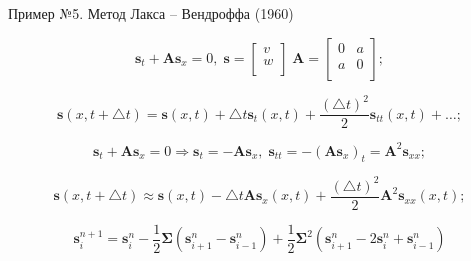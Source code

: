 \documentclass[10pt,xcolor=pst,aspectratio=169]{beamer}
\begin{document}
\begin{frame}{Пример №5. Метод Лакса -- Вендроффа (1960)}

    \transdissolve[duration=0.1]
    \justifying
    \large

    \[
        \mathbf{s}_{t} + \mathbf{A} \mathbf{s}_{x} = 0, \;
        \mathbf{s}
        =
        \begin{bmatrix}
           v \\
           w \\
        \end{bmatrix} \;
        \mathbf{A}
        =
        \begin{bmatrix}
           0 & a \\
           a & 0 \\
        \end{bmatrix};
    \]

    \[
        \mathbf{s} \left( x, t + \triangle t \right)
        =
        \mathbf{s} \left( x, t \right)
        + \triangle t \mathbf{s}_{t} \left( x, t \right)
        + \frac{\left( \triangle t \right)^{2}}{2} \mathbf{s}_{t t} \left( x, t \right)
        + \ldots;
    \]

    \[
        \mathbf{s}_{t} + \mathbf{A} \mathbf{s}_{x} = 0
        \Rightarrow
        \mathbf{s}_{t} = -\mathbf{A} \mathbf{s}_{x}, \;
        \mathbf{s}_{t t} = -\left( \mathbf{A} \mathbf{s}_{x} \right)_{t} = \mathbf{A}^{2} \mathbf{s}_{x x};
    \]

    \[
        \mathbf{s} \left( x, t + \triangle t \right)
        \approx
        \mathbf{s} \left( x, t \right)
        - \triangle t \mathbf{A} \mathbf{s}_{x} \left( x, t \right)
        + \frac{\left( \triangle t \right)^{2}}{2} \mathbf{A}^{2} \mathbf{s}_{x x} \left( x, t \right);
    \]

    \[
        \mathbf{s}^{n + 1}_{i}
        =
        \mathbf{s}^{n}_{i}
        - \frac{1}{2} \bm{\Sigma} \left( \mathbf{s}^{n}_{i + 1} - \mathbf{s}^{n}_{i - 1} \right)
        + \frac{1}{2} \bm{\Sigma}^{2} \left( \mathbf{s}^{n}_{i + 1} - 2 \mathbf{s}^{n}_{i} + \mathbf{s}^{n}_{i - 1} \right)
    \]

\end{frame}
\end{document}
